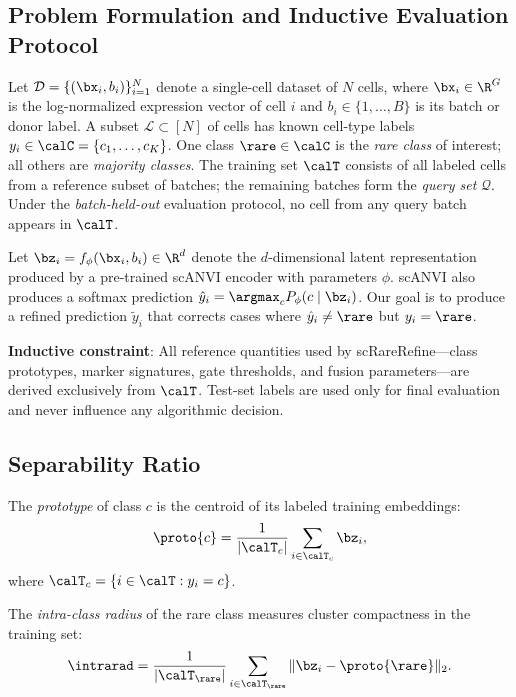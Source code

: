 \subsection{Problem Formulation and Inductive Evaluation Protocol}
\label{sec:problem}

Let $\mathcal{D} = \{(\bx_i, b_i)\}_{i=1}^N$ denote a single-cell dataset of $N$ cells, where $\bx_i \in \R^G$ is the log-normalized expression vector of cell $i$ and $b_i \in \{1, \ldots, B\}$ is its batch or donor label. A subset $\mathcal{L} \subset [N]$ of cells has known cell-type labels $y_i \in \calC = \{c_1, \ldots, c_K\}$. One class $\rare \in \calC$ is the \emph{rare class} of interest; all others are \emph{majority classes}. The training set $\calT$ consists of all labeled cells from a reference subset of batches; the remaining batches form the \emph{query set} $\mathcal{Q}$. Under the \emph{batch-held-out} evaluation protocol, no cell from any query batch appears in $\calT$.

Let $\bz_i = f_\phi(\bx_i, b_i) \in \R^d$ denote the $d$-dimensional latent representation produced by a pre-trained scANVI encoder with parameters $\phi$. scANVI also produces a softmax prediction $\hat{y}_i = \argmax_{c} P_\phi(c \mid \bz_i)$. Our goal is to produce a refined prediction $\tilde{y}_i$ that corrects cases where $\hat{y}_i \neq \rare$ but $y_i = \rare$.

\textbf{Inductive constraint}: All reference quantities used by scRareRefine---class prototypes, marker signatures, gate thresholds, and fusion parameters---are derived exclusively from $\calT$. Test-set labels are used only for final evaluation and never influence any algorithmic decision.

\subsection{Separability Ratio}
\label{sec:sepratio}

The \emph{prototype} of class $c$ is the centroid of its labeled training embeddings:
\begin{equation}
    \proto{c} = \frac{1}{|\calT_c|} \sum_{i \in \calT_c} \bz_i,
    \label{eq:prototype}
\end{equation}
where $\calT_c = \{i \in \calT : y_i = c\}$.

The \emph{intra-class radius} of the rare class measures cluster compactness in the training set:
\begin{equation}
    \intrarad = \frac{1}{|\calT_\rare|} \sum_{i \in \calT_\rare} \|\bz_i - \proto{\rare}\|_2.
    \label{eq:intrarad}
\end{equation}

